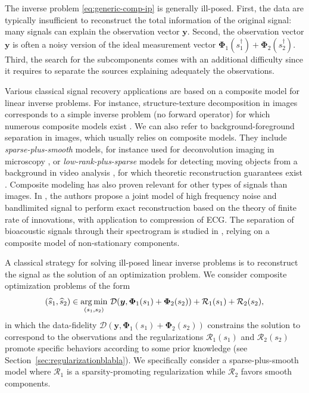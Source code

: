 \documentclass[12pt]{article}
\begin{document}
    
    The inverse problem \eqref{eq:generic-comp-ip} is generally ill-posed. First, the data are typically insufficient to reconstruct the total information of the original signal: many signals can explain the observation vector $\bm{y}$. Second, the observation vector $\bm{y}$ is often a noisy version of the ideal measurement vector $\bm{\Phi}_1(s_1^\dagger) + \bm{\Phi}_2(s_2^\dagger)$. Third, the search for the subcomponents comes with an additional difficulty since it requires to separate the sources explaining adequately the observations.

    Various classical signal recovery applications are based on a composite model for linear inverse problems.
    For instance, structure-texture decomposition in images corresponds to a simple inverse problem (no forward operator) for which numerous composite models exist \cite{aujol2006std,guennec2024std}.
    We can also refer to background-foreground separation in images, which usually relies on composite models. They include \emph{sparse-plus-smooth} models, for instance used for deconvolution imaging in microscopy \cite{debarnot2020learning,stergiopoulou2022colorme}, or \emph{low-rank-plus-sparse} models for detecting moving objects from a background in video analysis \cite{bouwmans2017decomposition}, for which theoretic reconstruction guarantees exist \cite{tanner2023composite}.
    Composite modeling has also proven relevant for other types of signals than images. In \cite{marziliano2006blsignals}, the authors propose a joint model of high frequency noise and bandlimited signal to perform exact reconstruction based on the theory of finite rate of innovations, with application to compression of ECG.
    The separation of bioacoustic signals through their spectrogram is studied in \cite{kreme2024separation}, relying on a composite model of non-stationary components.


    A classical strategy for solving ill-posed linear inverse problems is to reconstruct the signal as the solution of an optimization problem. We consider composite optimization problems of the form
    \begin{equation} \label{eq:compositepb}
        (\hfb,\hfh) \in \underset{(s_1,s_2)}{\arg\min} \ \mathcal{D}(\bm{y}, \bm{\Phi}_1(s_1) + \bm{\Phi}_2(s_2)) + \mathcal{R}_1 (s_1) + \mathcal{R}_2(s_2),
    \end{equation}
    in which the data-fidelity $\mathcal{D}(\bm{y}, \bm{\Phi}_1(s_1) + \bm{\Phi}_2(s_2))$ constrains the solution to correspond to the observations and the regularizations $\mathcal{R}_1 (s_1)$ and $\mathcal{R}_2(s_2)$ promote specific behaviors according to some prior knowledge (see Section~\ref{sec:regularizationblabla}). We specifically consider a sparse-plus-smooth model where $\mathcal{R}_1$ is a sparsity-promoting regularization while $\mathcal{R}_2$ favors smooth components.
\end{document}
